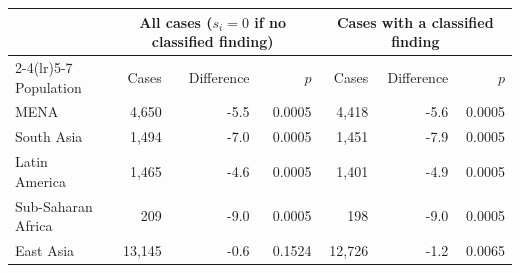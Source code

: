 \begin{tabular}{lrrrrrr}
\toprule
& \multicolumn{3}{c}{All cases ($s_i=0$ if no classified finding)} & \multicolumn{3}{c}{Cases with a classified finding} \\
\cmidrule(lr){2-4}\cmidrule(lr){5-7}
Population & Cases & Difference & $p$ & Cases & Difference & $p$ \\
\midrule
MENA & 4,650 & -5.5 & 0.0005 & 4,418 & -5.6 & 0.0005 \\
South Asia & 1,494 & -7.0 & 0.0005 & 1,451 & -7.9 & 0.0005 \\
Latin America & 1,465 & -4.6 & 0.0005 & 1,401 & -4.9 & 0.0005 \\
Sub-Saharan Africa & 209 & -9.0 & 0.0005 & 198 & -9.0 & 0.0005 \\
East Asia & 13,145 & -0.6 & 0.1524 & 12,726 & -1.2 & 0.0065 \\
\bottomrule
\end{tabular}
